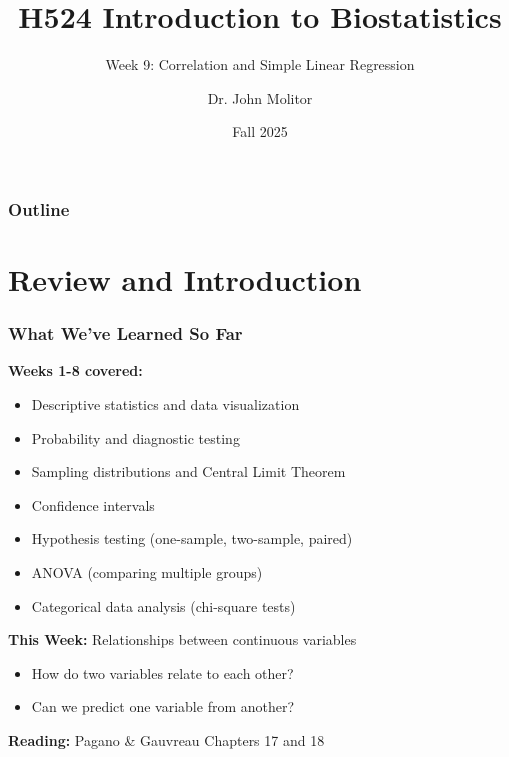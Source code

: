 \documentclass{beamer}
\title{H524 Introduction to Biostatistics}
\subtitle{Week 9: Correlation and Simple Linear Regression}
\author{Dr. John Molitor}
\institute{Oregon State University\\College of Health}
\date{Fall 2025}
\begin{document}
\frame{\titlepage}

\begin{frame}
\frametitle{Outline}
\tableofcontents
\end{frame}

\section{Review and Introduction}

\begin{frame}
\frametitle{What We've Learned So Far}
\textbf{Weeks 1-8 covered:}
\begin{itemize}
\item Descriptive statistics and data visualization
\item Probability and diagnostic testing
\item Sampling distributions and Central Limit Theorem
\item Confidence intervals
\item Hypothesis testing (one-sample, two-sample, paired)
\item ANOVA (comparing multiple groups)
\item Categorical data analysis (chi-square tests)
\end{itemize}

\vspace{0.5cm}
\textbf{This Week:} Relationships between continuous variables
\begin{itemize}
\item How do two variables relate to each other?
\item Can we predict one variable from another?
\end{itemize}

\vspace{0.3cm}
\textbf{Reading:} Pagano \& Gauvreau Chapters 17 and 18
\end{frame}
\end{document}

